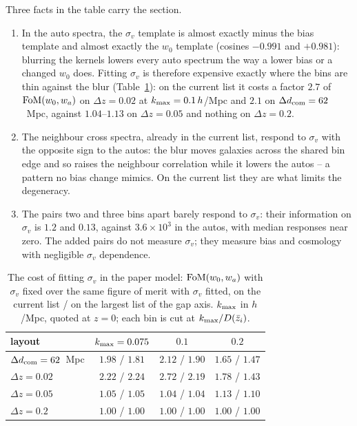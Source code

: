 \documentclass[11pt]{article}
\newcommand{\dcom}{$\Delta d_{\rm com} = 62$~Mpc}
\newcommand{\sv}{\sigma_v}
\begin{document}
Three facts in the table carry the section.
\begin{enumerate}
  \item In the auto spectra, the $\sv$ template is almost exactly
    minus the bias template and almost exactly the $w_0$ template
    (cosines $-0.991$ and $+0.981$): blurring the kernels lowers
    every auto spectrum the way a lower bias or a changed $w_0$
    does.  Fitting $\sv$ is therefore expensive exactly where the
    bins are thin against the blur (Table~\ref{tab:svcost}): on the
    current list it costs a factor $2.7$ of ${\rm FoM}(w_0, w_a)$ on
    $\Delta z = 0.02$ at $k_{\rm max} = 0.1\,h$/Mpc and $2.1$ on
    \dcom{}, against $1.04$--$1.13$ on $\Delta z = 0.05$ and nothing
    on $\Delta z = 0.2$.
  \item The neighbour cross spectra, already in the current list,
    respond to $\sv$ with the opposite sign to the autos: the blur
    moves galaxies across the shared bin edge and so raises the
    neighbour correlation while it lowers the autos -- a pattern no
    bias change mimics.  On the current list they are what limits
    the degeneracy.
  \item The pairs two and three bins apart barely respond to $\sv$:
    their information on $\sv$ is $1.2$ and $0.13$, against
    $3.6 \times 10^3$ in the autos, with median responses near
    zero.  The added pairs do not measure $\sv$; they measure bias
    and cosmology with negligible $\sv$ dependence.
\end{enumerate}

\begin{table}[ht]
  \centering
  \begin{tabular}{lccc}
    \hline
    layout & $k_{\rm max} = 0.075$ & $0.1$ & $0.2$ \\
    \hline
    \dcom{} & $1.98$ / $1.81$ & $2.12$ / $1.90$ & $1.65$ / $1.47$ \\
    $\Delta z = 0.02$ & $2.22$ / $2.24$ & $2.72$ / $2.19$ & $1.78$ / $1.43$ \\
    $\Delta z = 0.05$ & $1.05$ / $1.05$ & $1.04$ / $1.04$ & $1.13$ / $1.10$ \\
    $\Delta z = 0.2$ & $1.00$ / $1.00$ & $1.00$ / $1.00$ & $1.00$ / $1.00$ \\
    \hline
  \end{tabular}
  \caption{The cost of fitting $\sv$ in the paper model:
    ${\rm FoM}(w_0, w_a)$ with $\sv$ fixed over the same figure of
    merit with $\sv$ fitted, on the current list / on the largest
    list of the gap axis.  $k_{\rm max}$ in $h$/Mpc, quoted at
    $z = 0$; each bin is cut at $k_{\rm max}/D(\bar{z}_i)$.}
  \label{tab:svcost}
\end{table}
\end{document}
